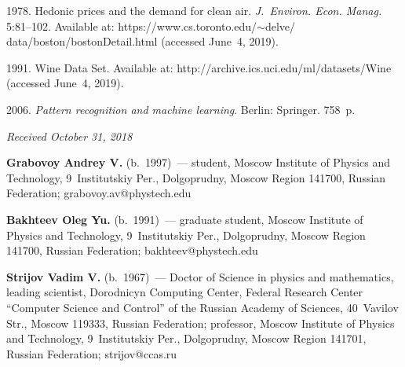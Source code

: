 \begin{multicols}{2}
{{\begin{thebibliography}{99}
  1978.
 Hedonic prices and the demand for clean air.
 \textit{J.~Environ. Econ. Manag.}
 5:81--102. Available at:
 {\sf https://www.cs.toronto.edu/$\sim$delve/ data/boston/bostonDetail.html}
 (accessed June~4, 2019).
    
     1991.  Wine Data Set. Available at:
    {\sf http://archive.ics.uci.edu/ml/datasets/Wine}
    (accessed June~4, 2019).
    
     2006. \textit{Pattern recognition and machine learning}. 
    Berlin: Springer. 758~p.
\end{thebibliography}

 }
 }

\end{multicols}

\vspace*{-6pt}

\hfill{\small\textit{Received October 31, 2018}}




\Contr

\noindent
\textbf{Grabovoy Andrey V.} (b.\ 1997)~--- 
student, Moscow Institute of Physics and Technology, 
9~Institutskiy Per., Dolgoprudny, Moscow Region 141700, Russian Federation; 
\mbox{grabovoy.av@phystech.edu}

\vspace*{6pt}

\noindent
\textbf{Bakhteev Oleg Yu.} (b.\ 1991)~--- 
graduate student, Moscow Institute of Physics and Technology, 
9~Institutskiy Per., Dolgoprudny, Moscow Region 141700, Russian Federation; 
\mbox{bakhteev@phystech.edu} 

\vspace*{6pt}

\noindent
\textbf{Strijov Vadim V.} (b.\ 1967)~---
Doctor of Science in physics and mathematics, leading scientist, 
Dorodnicyn Computing Center, Federal Research Center ``Computer Science and Control'' 
of the Russian Academy of Sciences, 40~Vavilov Str., Moscow 119333, Russian Federation; 
professor, Moscow Institute of Physics and Technology, 
9~Institutskiy Per., Dolgoprudny, Moscow Region 141701, Russian Federation; 
\mbox{strijov@ccas.ru}
\label{end\stat}

\renewcommand{\bibname}{\protect\rm Литература}  